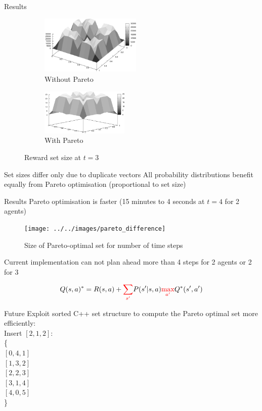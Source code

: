 \documentclass{beamer}
\begin{document}
\begin{frame}{Results}
	\begin{figure}
		\centering
		\begin{subfigure}[b]{0.3\textwidth}
			\centering
			\includegraphics[height=2.8cm]{../../images/r3_nopareto}
			\caption{Without Pareto}
			\label{fig:../../images/r3_nopareto}
		\end{subfigure}
		\hspace{2cm}
		\begin{subfigure}[b]{0.3\textwidth}
			\centering
			\includegraphics[height=2.2cm]{../../images/r3_diagonal}
			\caption{With Pareto}
			\label{fig:r3_diagonal}
		\end{subfigure}
		\caption{Reward set size at $t=3$}
	\end{figure}
	Set sizes differ only due to duplicate vectors All probability distributions
	benefit equally from Pareto optimisation (proportional to set size)
\end{frame}


\begin{frame}{Results}
	Pareto optimisation is faster (15 minutes to 4 seconds at $t=4$ for 2 agents)
	\begin{figure}
		\texttt{[image: ../../images/pareto\_difference]}
		\label{fig:../../images/pareto_difference}
		\caption{Size of Pareto-optimal set for number of time steps}
	\end{figure}
	Current implementation can not plan ahead more than 4 steps for 2 agents or
	2 for 3
\end{frame}


\begin{frame}[Results]
	$$ \displaystyle
	Q(s, a)^* = R(s, a) + {\color{red}\sum_{s'}} P(s'|s, a) {\color{red}\max_{a'}} Q^*(s', a')
	$$
\end{frame}


\begin{frame}{Future}
	Exploit sorted C++ set structure to compute the Pareto optimal set more
	efficiently:\\
	Insert $[2, 1, 2]$:\\
	\{\\
	$[0, 4, 1]$\\
	$[1, 3, 2]$\\
	$[2, 2, 3]$\\
	$[3, 1, 4]$\\
	$[4, 0, 5]$\\
	\}
\end{frame}
\end{document}
